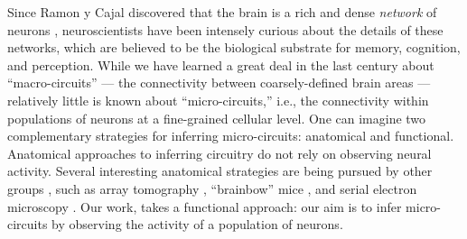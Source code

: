 Since Ramon y Cajal discovered that the brain is a rich and dense \emph{network} of neurons \cite{RamonyCajal04,RamonyCajal23}, neuroscientists have been intensely curious about the details of these networks, which are believed to be the biological substrate for memory, cognition, and perception. While we have learned a great deal in the last century about ``macro-circuits'' --- the connectivity between coarsely-defined brain areas --- relatively little is known about ``micro-circuits,'' i.e., the connectivity within populations of neurons at a fine-grained cellular level. One can imagine two complementary strategies for inferring micro-circuits: anatomical and functional. Anatomical approaches to inferring circuitry do not rely on observing neural activity.  Several interesting anatomical strategies are being pursued by other groups , such as array tomography \cite{MichevaSmith07}, ``brainbow'' mice \cite{Brainbow07}, and serial electron microscopy \cite{Briggman2006}. Our work,  takes a functional approach: our aim is to infer micro-circuits by observing the activity of a population of neurons.


